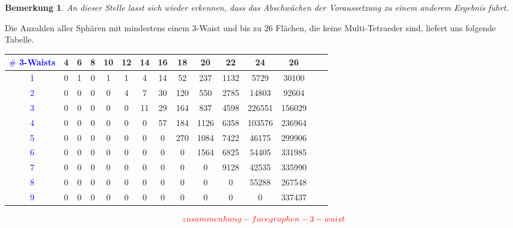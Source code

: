 \documentclass[12pt,titlepage,twoside,cleardoublepage]{article}
\theoremstyle{nummermitklammern}
\newtheorem{bemerkung}[temp]{Bemerkung}
\newtheorem{bemerkung}[zahl]{Bemerkung}
\numberwithin{equation}{section}
\begin{document}
\begin{bemerkung}
An dieser Stelle lasst sich wieder erkennen, dass das Abschwächen
der Voraussetzung zu einem anderem Ergebnis fuhrt.
\end{bemerkung}
Die Anzahlen aller Sphären mit mindestens einem 3-Waist und bis zu 26 Flächen,
die keine Multi-Tetraeder sind, liefert uns folgende Tabelle.
\begin{center}
\begin{tabular}{|c|c|c|c|c|c|c|c|c|c|c|c|c|c|c|}
\hline
\textcolor{blue}{$\#$ 3-Waists }&\textbf{4}& \textbf{6}& \textbf{8}& \textbf{10}& \textbf{12}& \textbf{14}& \textbf{16}& \textbf{18}& \textbf{20}& \textbf{22}& \textbf{24}& \textbf{26}\\
\hline
\textcolor{blue}{1} &0& 1& 0& 1& 1& 4& 14& 52& 237& 1132& 5729& 30100\\
\hline
\textcolor{blue}{2} &0& 0& 0 &0& 4& 7& 30& 120& 550& 2785& 14803& 92604\\
\hline
\textcolor{blue}{3}& 0& 0& 0& 0& 0& 11& 29& 164& 837& 4598& 226551& 156029\\
\hline
\textcolor{blue}{4}& 0& 0& 0& 0& 0& 0& 57& 184& 1126& 6358& 103576& 236964\\
\hline
\textcolor{blue}{5}& 0& 0& 0& 0& 0& 0& 0& 270& 1084& 7422& 46175& 299906\\
\hline
\textcolor{blue}{6} &0& 0& 0& 0& 0& 0& 0& 0 &1564& 6825& 54405& 331985\\
\hline
\textcolor{blue}{7}& 0& 0& 0& 0& 0& 0& 0& 0& 0& 9128& 42535& 335990\\
\hline
\textcolor{blue}{8}& 0& 0& 0& 0& 0& 0& 0& 0& 0& 0& 55288& 267548\\
\hline
\textcolor{blue}{9} &0& 0& 0& 0& 0& 0& 0& 0& 0& 0& 0& 337437\\
\hline
\end{tabular}
\end{center}
\[
\textcolor{red}{zusammenhang-facegraphen-3-waist }
\]
\end{document}
